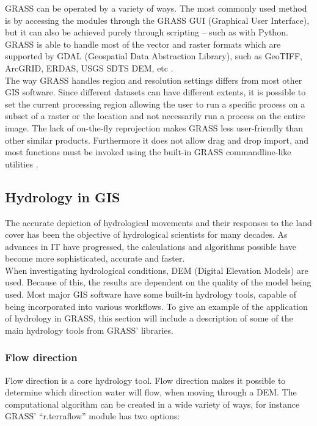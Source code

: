 GRASS can be operated by a variety of ways. The most commonly used method is by accessing the modules through the GRASS GUI (Graphical User Interface), but it can also be achieved purely through scripting – such as with Python. GRASS is able to handle most of the vector and raster formats which are supported by GDAL (Geospatial Data Abstraction Library), such as GeoTIFF, ArcGRID, ERDAS, USGS SDTS DEM, etc \citep{GRASSGIS}.\\

The way GRASS handles region and resolution settings differs from most other GIS software. Since different datasets can have different extents, it is possible to set the current processing region allowing the user to run a specific process on a subset of a raster or the location and not necessarily run a process on the entire image. 
The lack of on-the-fly reprojection makes GRASS less user-friendly than other similar products. Furthermore it does not allow drag and drop import, and most functions must be invoked using the built-in GRASS commandline-like utilities \citep{grassbook}.

\subsection{Hydrology in GIS}

The accurate depiction of hydrological movements and their responses to the land cover has been the objective of hydrological scientists for many decades. As advances in IT have progressed, the calculations and algorithms possible have become more sophisticated, accurate and faster.\\

When investigating hydrological conditions, DEM (Digital Elevation Models) are used. Because of this, the results are dependent on the quality of the model being used. Most major GIS software have some built-in hydrology tools, capable of being incorporated into various workflows. To give an example of the application of hydrology in GRASS, this section will include a description of some of the main hydrology tools from GRASS' libraries.

\subsubsection{Flow direction}
Flow direction is a core hydrology tool. Flow direction makes it possible to determine which direction water will flow, when moving through a DEM. The computational algorithm can be created in a wide variety of ways, for instance GRASS' “r.terraflow” module has two options: 

